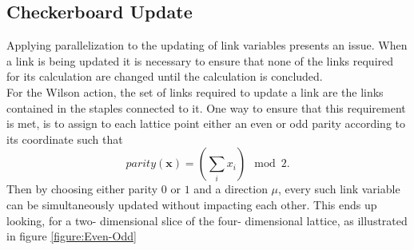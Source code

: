 \documentclass[a4paper,10pt]{book}
\begin{document}
\subsection{Checkerboard Update}\label{sec:Checkerboard_Update}
Applying parallelization to the updating of link variables presents an issue. When a link is being updated it is necessary to ensure that none of the links required for its calculation are changed until the calculation is concluded.\\For the Wilson action, the set of links required to update a link are the links contained in the staples connected to it. One way to ensure that this requirement is met, is to assign to each lattice point either an even or odd parity according to its coordinate
such that 
\begin{equation}
parity(\mathbf{x}) = \left( \sum\limits_i x_i \right) \mod 2.
\end{equation}
Then by choosing either parity $0$ or $1$ and a direction $\mu$, every such link variable can be simultaneously updated without impacting each other. This ends up looking, for a two- dimensional slice of the four- dimensional lattice, as illustrated in figure \ref{figure:Even-Odd}
\end{document}
